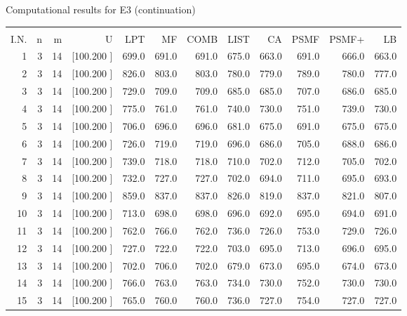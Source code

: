 \documentclass[12pt,a4paper]{article}
\begin{document}
\newpage
\begin{center}
 Computational results for E3 (continuation) {\tiny
\begin{tabular}{r r r r r r r r r r r r}\hline
    &   &   &          &        &        &        &        &        &        &        &       \\[-0.1in]
  I.N.  &  n  &  m  &  U  &  LPT  &  MF  &  COMB  &  LIST  &  CA  & PSMF &PSMF+ & LB \\[0.03in]
\hline
   1&  3& 14&[100.200   ]&   699.0&   691.0&   691.0&   675.0&   663.0&   691.0&   666.0&   663.0\\[-0.02in]
   2&  3& 14&[100.200   ]&   826.0&   803.0&   803.0&   780.0&   779.0&   789.0&   780.0&   777.0\\[-0.02in]
   3&  3& 14&[100.200   ]&   729.0&   709.0&   709.0&   685.0&   685.0&   707.0&   686.0&   685.0\\[-0.02in]
   4&  3& 14&[100.200   ]&   775.0&   761.0&   761.0&   740.0&   730.0&   751.0&   739.0&   730.0\\[-0.02in]
   5&  3& 14&[100.200   ]&   706.0&   696.0&   696.0&   681.0&   675.0&   691.0&   675.0&   675.0\\[-0.02in]
   6&  3& 14&[100.200   ]&   726.0&   719.0&   719.0&   696.0&   686.0&   705.0&   688.0&   686.0\\[-0.02in]
   7&  3& 14&[100.200   ]&   739.0&   718.0&   718.0&   710.0&   702.0&   712.0&   705.0&   702.0\\[-0.02in]
   8&  3& 14&[100.200   ]&   732.0&   727.0&   727.0&   702.0&   694.0&   711.0&   695.0&   693.0\\[-0.02in]
   9&  3& 14&[100.200   ]&   859.0&   837.0&   837.0&   826.0&   819.0&   837.0&   821.0&   807.0\\[-0.02in]
  10&  3& 14&[100.200   ]&   713.0&   698.0&   698.0&   696.0&   692.0&   695.0&   694.0&   691.0\\[-0.02in]
  11&  3& 14&[100.200   ]&   762.0&   766.0&   762.0&   736.0&   726.0&   753.0&   729.0&   726.0\\[-0.02in]
  12&  3& 14&[100.200   ]&   727.0&   722.0&   722.0&   703.0&   695.0&   713.0&   696.0&   695.0\\[-0.02in]
  13&  3& 14&[100.200   ]&   702.0&   706.0&   702.0&   679.0&   673.0&   695.0&   674.0&   673.0\\[-0.02in]
  14&  3& 14&[100.200   ]&   766.0&   763.0&   763.0&   734.0&   730.0&   752.0&   730.0&   730.0\\[-0.02in]
  15&  3& 14&[100.200   ]&   765.0&   760.0&   760.0&   736.0&   727.0&   754.0&   727.0&   727.0\\[-0.02in]

\end{tabular}}
\end{center}
\end{document}
